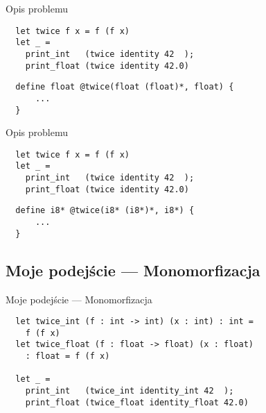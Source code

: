 \documentclass{beamer}
\begin{document}
\begin{frame}[fragile]{Opis problemu}%
\begin{center}
\begin{minipage}{0.8\textwidth}
\begin{verbatim}
  let twice f x = f (f x)
  let _ = 
    print_int   (twice identity 42  );
    print_float (twice identity 42.0)
\end{verbatim}
\pagebreak
\pagebreak
\begin{verbatim}
  define float @twice(float (float)*, float) {
      ...
  }
\end{verbatim}
\end{minipage}
\end{center}
\end{frame}

\begin{frame}[fragile]{Opis problemu}%
\begin{center}
\begin{minipage}{0.8\textwidth}
\begin{verbatim}
  let twice f x = f (f x)
  let _ = 
    print_int   (twice identity 42  );
    print_float (twice identity 42.0)
\end{verbatim}
\pagebreak
\pagebreak
\begin{verbatim}
  define i8* @twice(i8* (i8*)*, i8*) {
      ...
  }
\end{verbatim}
\end{minipage}
\end{center}
\end{frame}

\subsection{Moje podejście --- Monomorfizacja}

\begin{frame}[fragile]{Moje podejście --- Monomorfizacja}
\begin{center}
\begin{minipage}{1.0\textwidth}
\begin{verbatim}
  let twice_int (f : int -> int) (x : int) : int = 
    f (f x)
  let twice_float (f : float -> float) (x : float) 
    : float = f (f x)

  let _ = 
    print_int   (twice_int identity_int 42  );
    print_float (twice_float identity_float 42.0)
\end{verbatim}
\end{minipage}
\end{center}
\end{frame}
\end{document}
